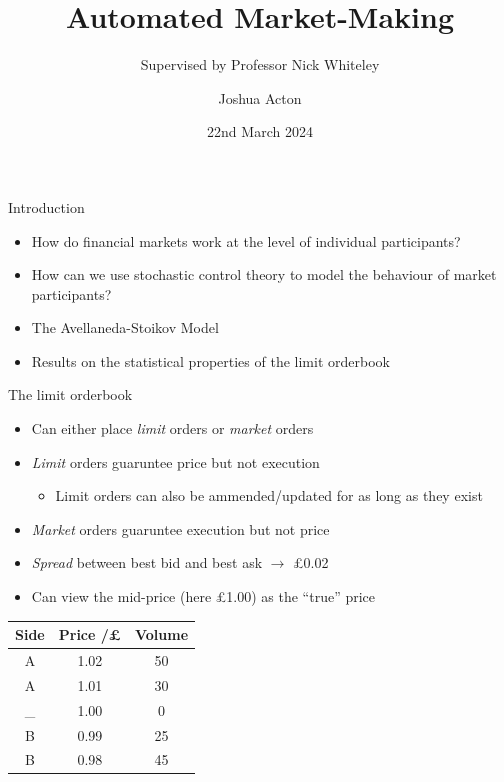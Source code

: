 \documentclass{beamer} %
\title{Automated Market-Making}
\author{Joshua Acton}
\date{22nd March 2024}
\subtitle{Supervised by Professor Nick Whiteley}
\begin{document}
\begin{frame}
    \titlepage
\end{frame}

\begin{frame}{Introduction}
    \begin{itemize}
    \item How do financial markets work at the level of individual participants?
    \item How can we use stochastic control theory to model the behaviour of market participants?
    \item The Avellaneda-Stoikov Model
    \item Results on the statistical properties of the limit orderbook
    \end{itemize}
\end{frame}

\begin{frame}{The limit orderbook}
    \begin{itemize}
        \item Can either place \emph{limit} orders or \emph{market} orders
        \item \emph{Limit} orders guaruntee price but not execution
        \begin{itemize}
            \item Limit orders can also be ammended/updated for as long as they exist
        \end{itemize}
        \item \emph{Market} orders guaruntee execution but not price
        \item \emph{Spread} between best bid and best ask $\rightarrow$ £0.02
        \item Can view the mid-price (here £1.00) as the ``true'' price
    \end{itemize}
    \begin{center}
        \begin{tabular}{ |c|c|c| } 
            \hline
            Side & Price /£ & Volume \\ 
            \hline
            A & 1.02 & 50 \\
            A & 1.01 & 30 \\
            \_ & 1.00 & 0 \\
            B & 0.99 & 25 \\ 
            B & 0.98 & 45 \\
            \hline
        \end{tabular}
    \end{center}
\end{frame}
\end{document}

